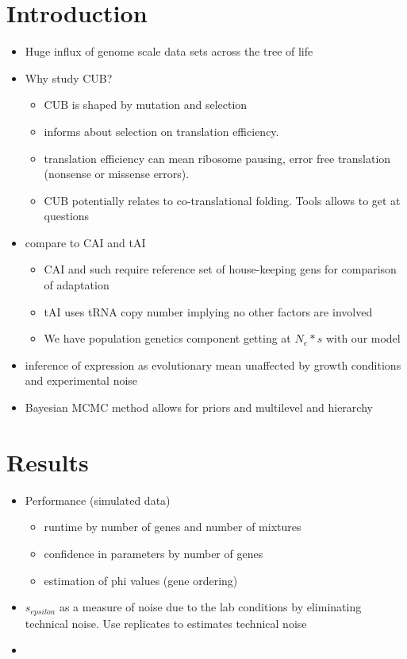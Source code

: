 \documentclass[12pt,draft]{article}
\begin{document}
\doublespacing
\linenumbers


\section*{Introduction}

\begin{itemize}
\item Huge influx of genome scale data sets across the tree of life
\item Why study CUB?
	\begin{itemize}
	\item CUB is shaped by mutation and selection
	\item informs about selection on translation efficiency.
	\item translation efficiency can mean ribosome pausing, error free translation (nonsense or missense errors).
	\item CUB potentially relates to co-translational folding. Tools allows to get at questions
	\end{itemize}
\item compare to CAI and tAI
	\begin{itemize}
	\item CAI and such require reference set of house-keeping gens for comparison of adaptation
	\item tAI uses tRNA copy number implying no other factors are involved
	\item We have population genetics component getting at $N_e * s$ with our model
	\end{itemize}
\item inference of expression as evolutionary mean unaffected by growth conditions and experimental noise
\item Bayesian MCMC method allows for priors and multilevel and hierarchy 
\end{itemize}



\section*{Results}
\begin{itemize}
\item Performance (simulated data)
	\begin{itemize}
	\item runtime by number of genes and number of mixtures
	\item confidence in parameters by number of genes
	\item estimation of phi values (gene ordering)
	\end{itemize}
\item $s_{epsilon}$ as a measure of noise due to the lab conditions by eliminating technical 			noise. Use replicates to estimates technical noise

\item 
\end{itemize}
\end{document}
